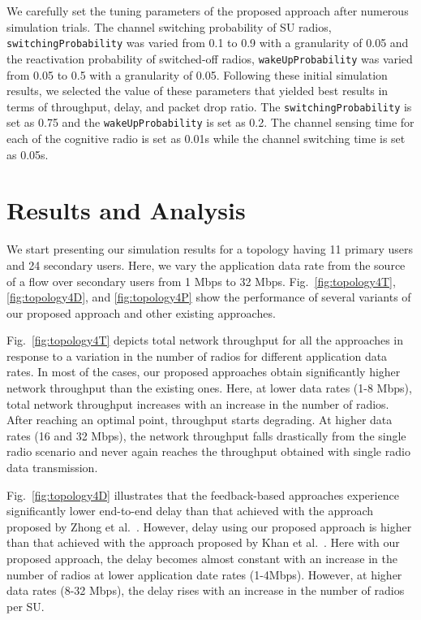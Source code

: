 We carefully set the tuning parameters of the proposed approach after numerous simulation trials. The channel switching probability of SU radios, \texttt{switchingProbability} was varied from 0.1 to 0.9 with a granularity of 0.05 and the reactivation probability of switched-off radios, \texttt{wakeUpProbability} was varied from 0.05 to 0.5 with a granularity of 0.05. Following these initial simulation results, we selected the value of these parameters that yielded best results in terms of throughput, delay, and packet drop ratio. The \texttt{switchingProbability} is set as 0.75 and the \texttt{wakeUpProbability} is set as 0.2. The channel sensing time for each of the cognitive radio is set as 0.01s while the channel switching time is set as 0.05s.

\section{Results and Analysis}

We start presenting our simulation results for a topology having 11 primary users and 24 secondary users. Here, we vary the application data rate from the source of a flow over secondary users from 1 Mbps to 32 Mbps. Fig.~\ref{fig:topology4T}, \ref{fig:topology4D}, and \ref{fig:topology4P} show the performance of several variants of our proposed approach and other existing approaches.

Fig.~\ref{fig:topology4T} depicts total network throughput for all the approaches in response to a variation in the number of radios for different application data rates. In most of the cases, our proposed approaches obtain significantly higher network throughput than the existing ones. Here, at lower data rates (1-8 Mbps), total network throughput increases with an increase in the number of radios. After reaching an optimal point, throughput starts degrading. At higher data rates (16 and 32 Mbps), the network throughput falls drastically from the single radio scenario and never again reaches the throughput obtained with single radio data transmission.

Fig.~\ref{fig:topology4D} illustrates that the feedback-based approaches experience significantly lower end-to-end delay than that achieved with the approach proposed by Zhong et al.~\cite{zhong2014capacity}. However, delay using our proposed approach is higher than that achieved with the approach proposed by Khan et al.~\cite{khan2015towards}. Here with our proposed approach, the delay becomes almost constant with an increase in the number of radios at lower application date rates (1-4Mbps). However, at higher data rates (8-32 Mbps), the delay rises with an increase in the number of radios per SU.

